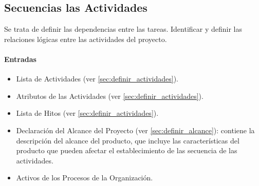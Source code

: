 \documentclass[a4paper,twosides]{article}
\newlength{\wideitemsep}
\let\olditem\item
\renewcommand{\item}{\setlength{\itemsep}{\wideitemsep}\olditem}
\begin{document}
\subsection{Secuencias las Actividades} \label{sec:secuenciar_actividades}
Se trata de definir las dependencias entre las tareas. Identificar y definir las relaciones lógicas entre las actividades del proyecto.

\paragraph{Entradas}
\begin{itemize}
\item Lista de Actividades (ver \ref{sec:definir_actividades}).
\item Atributos de las Actividades (ver \ref{sec:definir_actividades}).
\item Lista de Hitos (ver \ref{sec:definir_actividades}).
\item Declaración del Alcance del Proyecto (ver \ref{sec:definir_alcance}): contiene la descripción del alcance del producto, que incluye las características del producto que pueden afectar el establecimiento de las secuencia de las actividades.
\item Activos de los Procesos de la Organización.
\end{itemize}
\end{document}
